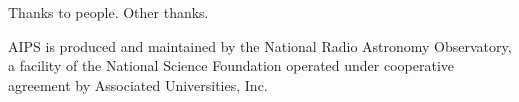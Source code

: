 \documentclass[graybox]{svmult}
\begin{document}
\begin{acknowledgement}
Thanks to people. Other thanks.

AIPS is produced and maintained by the National Radio Astronomy
Observatory, a facility of the National Science Foundation
operated under cooperative agreement by Associated Universities, Inc.

\end{acknowledgement}

%



\end{document}
